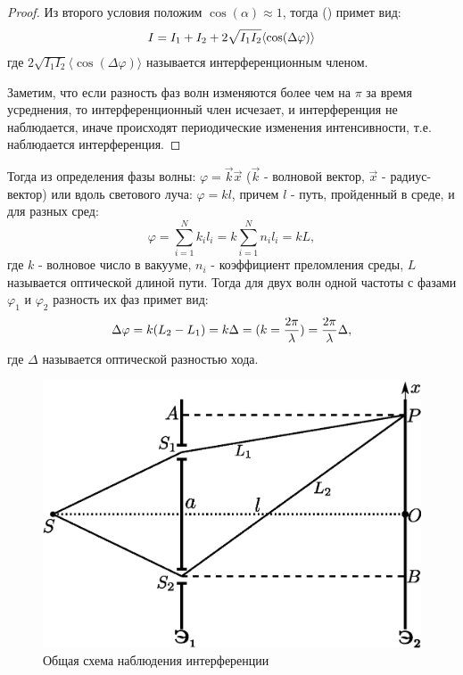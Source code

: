 \documentclass[__main__.tex]{subfiles}
\begin{document}
\begin{proof}
Из второго условия положим $\cos(\alpha)\approx 1$, тогда () примет вид:
\begin{gather}
\llabel{o-02-mainint}
I = I_1 + I_2 + 2\sqrt{I_1 I_2}\langle\cos(\Delta \varphi)\rangle
\end{gather}
где $2\sqrt{I_1 I_2}\langle\cos(\Delta \varphi)\rangle$ называется интерференционным членом.

Заметим, что если разность фаз волн изменяются более чем на $\pi$ за время усреднения, то интерференционный член исчезает, и интерференция не наблюдается, иначе происходят периодические изменения интенсивности, т.е. наблюдается интерференция.
\end{proof}

Тогда из определения фазы волны: $\varphi = \vec{k}\vec{x}$ ($\vec{k}$ - волновой вектор, $\vec{x}$ - радиус-вектор) или вдоль светового луча: $\varphi = kl$, причем $l$ - путь, пройденный в среде, и для разных сред:
$$
\varphi = \sum_{i=1}^{N}k_i l_i = k\sum_{i=1}^{N}n_i l_i = kL,
$$
где $k$ - волновое число в вакууме, $n_i$ - коэффициент преломления среды, $L$ называется оптической длиной пути.
Тогда для двух волн одной частоты с фазами $\varphi_1$ и $\varphi_2$ разность их фаз примет вид:
\begin{gather}
\llabel{o-02-phasediff}
\Delta \varphi = k(L_2 - L_1) = k \Delta =
(k = \frac{2\pi}{\lambda}) =
\frac{2\pi}{\lambda}\Delta,
\end{gather}
где $\Delta$ называется оптической разностью хода. 

\begin{figure}
	\includegraphics[width=1\linewidth]{img/o-02}{}
	\caption{Общая схема наблюдения интерференции}
\end{figure}
 
\end{document}
